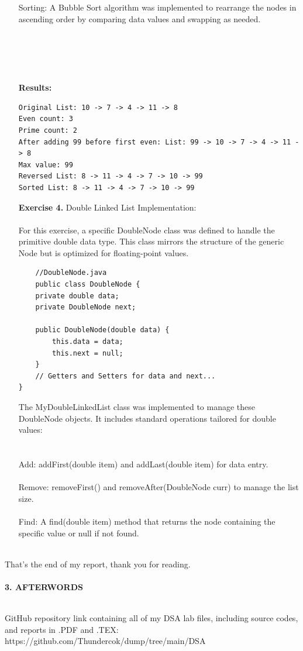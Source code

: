 \documentclass[12pt]{article}
\begin{document}
\begin{itemize}
Sorting: A Bubble Sort algorithm was implemented to rearrange the nodes in ascending order by comparing data values and swapping as needed.
\\\\\\\\\\\\
\textbf{Results:}
\begin{verbatim}
Original List: 10 -> 7 -> 4 -> 11 -> 8
Even count: 3
Prime count: 2
After adding 99 before first even: List: 99 -> 10 -> 7 -> 4 -> 11 -> 8
Max value: 99
Reversed List: 8 -> 11 -> 4 -> 7 -> 10 -> 99
Sorted List: 8 -> 11 -> 4 -> 7 -> 10 -> 99
\end{verbatim}
\vspace{20pt}
\item[\textbf{Exercise 4.}] Double Linked List Implementation: \\\\
For this exercise, a specific DoubleNode class was defined to handle the primitive double data type. This class mirrors the structure of the generic Node but is optimized for floating-point values.\\
\begin{verbatim}
    //DoubleNode.java
    public class DoubleNode {
    private double data;
    private DoubleNode next;

    public DoubleNode(double data) {
        this.data = data;
        this.next = null;
    }
    // Getters and Setters for data and next...
}
\end{verbatim}
The MyDoubleLinkedList class was implemented to manage these DoubleNode objects. It includes standard operations tailored for double values:\\\\\\
Add: addFirst(double item) and addLast(double item) for data entry.\\\\
Remove: removeFirst() and removeAfter(DoubleNode curr) to manage the list size.\\\\
Find: A find(double item) method that returns the node containing the specific value or null if not found.\\\\
\end{itemize}


That's the end of my report, thank you for reading. \\\\
\textbf{3. AFTERWORDS}\\\\

\centering
\vspace{20pt}


GitHub repository link containing all of my DSA lab files, including source codes, \\ and reports in .PDF and .TEX:\\ https://github.com/Thundercok/dump/tree/main/DSA
\end{document}
